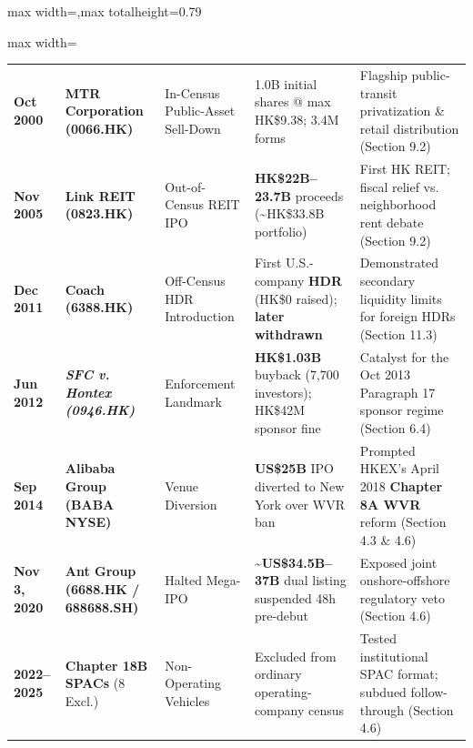 \documentclass[11pt,letterpaper]{article}
\begin{document}
\begin{table}[!htbp]
\begin{adjustbox}{max width=\textwidth,max totalheight=0.79\textheight}
\begin{minipage}{\textwidth}
\begin{adjustbox}{max width=\textwidth}
\begin{tabular}{l>{\raggedright\arraybackslash}p{3.33cm}>{\raggedright\arraybackslash}p{2.60cm}>{\raggedright\arraybackslash}p{4.28cm}>{\raggedright\arraybackslash}p{4.28cm}}
\textbf{Oct 2000} & \textbf{MTR Corporation (0066.HK)} & In-Census Public-Asset Sell-Down & 1.0B initial shares @ max HK\$9.38; 3.4M forms & Flagship public-transit privatization \& retail distribution (Section 9.2) \\
\textbf{Nov 2005} & \textbf{Link REIT (0823.HK)} & Out-of-Census REIT IPO & \textbf{HK\$22B–23.7B} proceeds (\textasciitilde{}HK\$33.8B portfolio) & First HK REIT; fiscal relief vs. neighborhood rent debate (Section 9.2) \\
\textbf{Dec 2011} & \textbf{Coach (6388.HK)} & Off-Census HDR Introduction & First U.S.-company \textbf{HDR} (HK\$0 raised); \textbf{later withdrawn} & Demonstrated secondary liquidity limits for foreign HDRs (Section 11.3) \\
\textbf{Jun 2012} & \textbf{\textit{SFC v. Hontex (0946.HK)}} & Enforcement Landmark & \textbf{HK\$1.03B} buyback (7,700 investors); HK\$42M sponsor fine & Catalyst for the Oct 2013 Paragraph 17 sponsor regime (Section 6.4) \\
\textbf{Sep 2014} & \textbf{Alibaba Group (BABA NYSE)} & Venue Diversion & \textbf{US\$25B} IPO diverted to New York over WVR ban & Prompted HKEX’s April 2018 \textbf{Chapter 8A WVR} reform (Section 4.3 \& 4.6) \\
\textbf{Nov 3, 2020} & \textbf{Ant Group (6688.HK / 688688.SH)} & Halted Mega-IPO & \textbf{\textasciitilde{}US\$34.5B–37B} dual listing suspended 48h pre-debut & Exposed joint onshore-offshore regulatory veto (Section 4.6) \\
\textbf{2022–2025} & \textbf{Chapter 18B SPACs} (8 Excl.) & Non-Operating Vehicles & Excluded from ordinary operating-company census & Tested institutional SPAC format; subdued follow-through (Section 4.6) \\
\bottomrule
\end{tabular}
\end{adjustbox}
\end{minipage}
\end{adjustbox}

\end{table}
\end{document}
